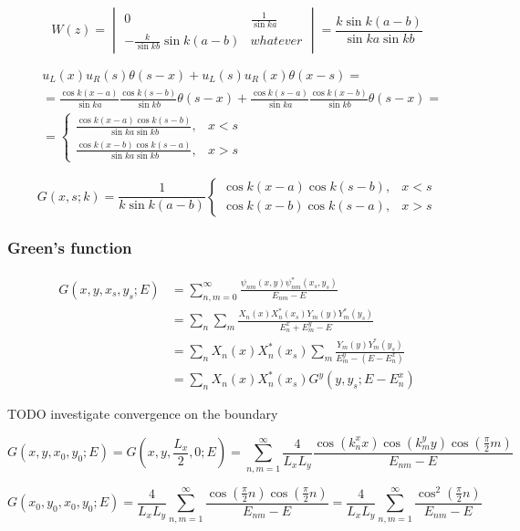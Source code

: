 \documentclass[12pt, a4paper]{article}
\begin{document}
$$W(z) = \begin{vmatrix}
0 & \frac{1}{\sin ka} \\
-\frac{k}{\sin kb} \sin k (a - b) & whatever
\end{vmatrix} = \frac{k \sin k (a - b)}{\sin ka \sin kb}$$

\begin{align*}
& u_L(x) u_R(s) \theta(s - x) + u_L(s) u_R(x) \theta(x - s) = \\ 
& = \frac{\cos k (x - a)}{\sin ka} \frac{\cos k (s - b)}{\sin kb} \theta(s - x) + \frac{\cos k (s - a)}{\sin ka} \frac{\cos k (x - b)}{\sin kb} \theta(s - x) = \\
& = \begin{cases}
\frac{\cos k (x - a) \cos k (s - b)}{\sin ka \sin kb}, & x < s\\
\frac{\cos k (x - b) \cos k (s - a)}{\sin ka \sin kb}, & x > s 
\end{cases}
\end{align*}

$$G(x, s; k) = \frac{1}{k \sin k (a - b)}\begin{cases}
\cos k (x - a) \cos k (s - b), & x < s\\
\cos k (x - b) \cos k (s - a), & x > s 
\end{cases}$$

\subsubsection{Green's function}

\begin{align*}
G(x, y, x_s, y_s; E)
&= \sum\limits_{n, m = 0}^\infty \frac{\psi_{nm}(x, y) \psi^*_{nm}(x_s, y_s)}{E_{nm} - E} \\
&= \sum\limits_n \sum\limits_m \frac{X_n(x) X^*_n(x_s) Y_m(y) Y_m^*(y_s)}{E^x_n + E^y_m - E} \\
&= \sum\limits_n X_n(x) X^*_n(x_s) \sum\limits_m \frac{Y_m(y) Y_m^*(y_s)}{E^y_m - (E - E^x_n)} \\
&= \sum\limits_n X_n(x) X^*_n(x_s) G^y(y, y_s; E - E^x_n)
\end{align*}


TODO investigate convergence on the boundary

$$G(x, y, x_0, y_0; E) = G(x, y, \frac{L_x}{2}, 0; E) = \sum\limits_{n, m = 1}^\infty \frac{4}{L_x L_y} \frac{\cos(k^x_n x) \cos(k^y_m y) \cos(\frac{\pi}{2}m)}{E_{nm} - E}$$

$$G(x_0, y_0, x_0, y_0; E) = \frac{4}{L_x L_y} \sum\limits_{n, m = 1}^\infty \frac{\cos(\frac{\pi}{2}n) \cos(\frac{\pi}{2}n)}{E_{nm} - E} = \frac{4}{L_x L_y} \sum\limits_{n, m = 1}^\infty \frac{\cos^2(\frac{\pi}{2}n)}{E_{nm} - E}$$
\end{document}
